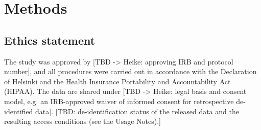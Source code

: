 
\section*{Methods}\label{sec:methods}

\subsection*{Ethics statement}\label{subsec:ethics}
The study was approved by [TBD -> Heike: approving IRB and protocol number], and all procedures were carried out in accordance with the Declaration of Helsinki and the Health Insurance Portability and Accountability Act (HIPAA).
The data are shared under [TBD -> Heike: legal basis and consent model, e.g. an IRB-approved waiver of informed consent for retrospective de-identified data].
[TBD: de-identification status of the released data and the resulting access conditions (see the Usage Notes).]


